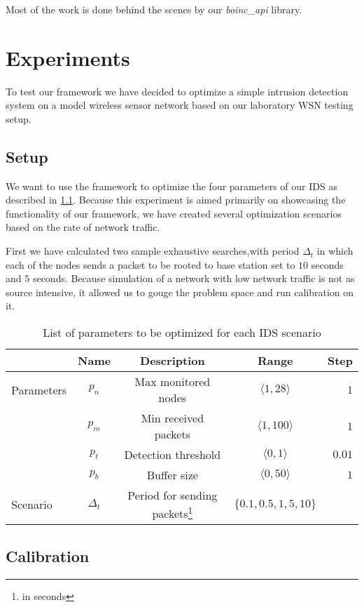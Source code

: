 \documentclass[12pt,oneside]{fithesis2}
\begin{document}
Most of the work is done behind the scenes by our \emph{boinc\_api} library.

\chapter{Experiments}
\label{chap:exp}
To test our framework we have decided to optimize a simple intrusion detection system on a model wireless sensor network based on our laboratory WSN testing setup.

\section{Setup}
We want to use the framework to optimize the four parameters of our IDS as described in \ref{tab:myfirsttable}. 
Because this experiment is aimed primarily on showcasing the functionality of our framework, we have created several optimization scenarios based on the rate of network traffic.

First we have calculated two sample exhaustive searches,with period $\Delta_t$ in which each of the nodes sends a packet to be rooted to base station set to $10$ seconds and $5$ seconds. Because simulation of a network with low network traffic is not as source intensive, it allowed us to gouge the problem space and run calibration on it.  

\begin{table}
  \centering
\begin{tabular}{ l c c c r}
  & Name & Description & Range & Step \\  
  \hline
  \hline                        
   Parameters & $p_n$ & Max monitored nodes & $\langle 1, 28 \rangle$ & $1$ \\
    & $p_m$ & Min received packets & $\langle 1, 100 \rangle$ & $1$ \\
    & $p_t$ & Detection threshold & $\langle 0, 1 \rangle$ & $0.01$ \\
    & $p_b$ & Buffer size & $\langle 0, 50 \rangle$ & $1$ \\
  \hline  
  \hline
  Scenario & $\Delta_t$ & Period for sending packets\footnote{in seconds} &  $\{ 0.1,0.5,1,5,10\}$  & \\
\end{tabular}
  \caption{List of parameters to be optimized for each IDS scenario}
  \label{tab:myfirsttable}
\end{table}

\section{Calibration}
\end{document}
